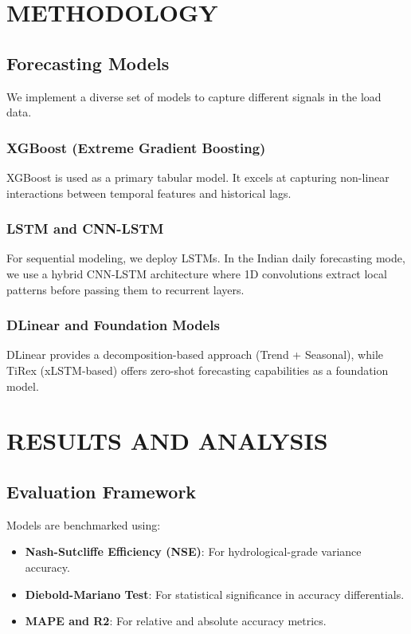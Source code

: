 \documentclass[12pt,a4paper,twoside,fleqn]{report}
\begin{document}
\chapter{METHODOLOGY}
\section{Forecasting Models}
We implement a diverse set of models to capture different signals in the load data.

\subsection{XGBoost (Extreme Gradient Boosting)}
XGBoost is used as a primary tabular model. It excels at capturing non-linear interactions between temporal features and historical lags.

\subsection{LSTM and CNN-LSTM}
For sequential modeling, we deploy LSTMs. In the Indian daily forecasting mode, we use a hybrid CNN-LSTM architecture where 1D convolutions extract local patterns before passing them to recurrent layers.

\subsection{DLinear and Foundation Models}
DLinear provides a decomposition-based approach (Trend + Seasonal), while TiRex (xLSTM-based) offers zero-shot forecasting capabilities as a foundation model.

\chapter{RESULTS AND ANALYSIS}
\section{Evaluation Framework}
Models are benchmarked using:
\begin{itemize}
    \item \textbf{Nash-Sutcliffe Efficiency (NSE)}: For hydrological-grade variance accuracy.
    \item \textbf{Diebold-Mariano Test}: For statistical significance in accuracy differentials.
    \item \textbf{MAPE and R2}: For relative and absolute accuracy metrics.
\end{itemize}
\end{document}

